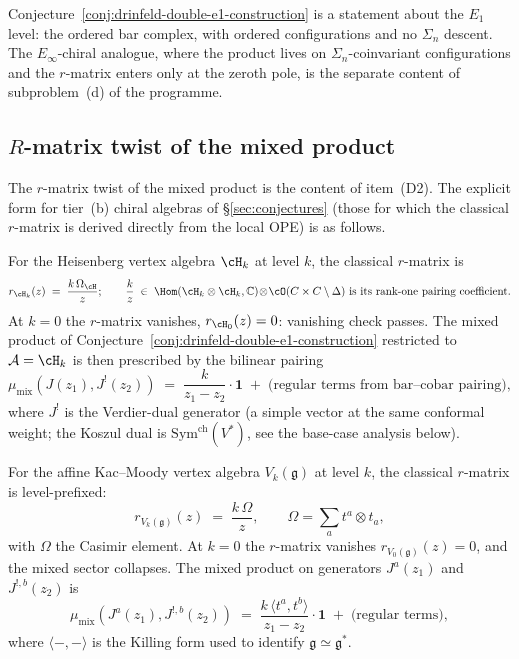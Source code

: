 Conjecture~\ref{conj:drinfeld-double-e1-construction}
is a statement about the $E_1$ level: the ordered bar
complex, with ordered configurations and no $\Sigma_n$
descent. The $E_\infty$-chiral analogue, where the product
lives on $\Sigma_n$-coinvariant configurations and the
$r$-matrix enters only at the zeroth pole, is the separate
content of subproblem~(d) of the programme.

\subsection{$R$-matrix twist of the mixed product}
\label{subsec:drinfeld-e1-twist}

The $r$-matrix twist of the mixed product is the content of
item~(D2). The explicit form for tier~(b) chiral
algebras of \S\ref{sec:conjectures} (those for which the
classical $r$-matrix is derived directly from the local OPE)
is as follows.

For the Heisenberg vertex algebra $\cH_k$ at level $k$, the
classical $r$-matrix is
\begin{equation}
\label{eq:drinfeld-r-heisenberg}
r_{\cH_k}(z)
\;=\;
\frac{k\,\Omega_{\cH}}{z};
\qquad
\frac{k}{z}\;\in\;\Hom(\cH_k\otimes\cH_k,\mathbb{C})\!\otimes\!\cO(C\times C \setminus \Delta)
\text{ is its rank-one pairing coefficient.}
\end{equation}
At $k = 0$ the $r$-matrix vanishes, $r_{\cH_0}(z) = 0$:
vanishing check passes. The mixed product of
Conjecture~\ref{conj:drinfeld-double-e1-construction}
restricted to $\cA = \cH_k$ is then prescribed by the
bilinear pairing
\begin{equation}
\label{eq:drinfeld-mix-heisenberg}
\mu_{\mathrm{mix}}(J(z_1),J^!(z_2))
\;=\;
\frac{k}{z_1-z_2}\cdot \mathbf 1
\;+\;\text{(regular terms from bar--cobar pairing)},
\end{equation}
where $J^!$ is the Verdier-dual generator (a simple vector
at the same conformal weight; the Koszul dual is
$\mathrm{Sym}^{\mathrm{ch}}(V^*)$, see the base-case analysis below).

For the affine Kac--Moody vertex algebra $V_k(\mathfrak g)$
at level $k$, the classical $r$-matrix is level-prefixed:
\begin{equation}
\label{eq:drinfeld-r-kmc}
r_{V_k(\mathfrak g)}(z) \;=\;\frac{k\,\Omega}{z},
\qquad
\Omega = \sum_a t^a\otimes t_a,
\end{equation}
with $\Omega$ the Casimir element. At $k=0$ the $r$-matrix
vanishes $r_{V_0(\mathfrak g)}(z) = 0$, and the mixed
sector collapses. The mixed
product on generators $J^a(z_1)$ and $J^{!,b}(z_2)$ is
\begin{equation}
\label{eq:drinfeld-mix-kmc}
\mu_{\mathrm{mix}}(J^a(z_1), J^{!,b}(z_2))
\;=\;
\frac{k\,\langle t^a,t^b\rangle}{z_1 - z_2}\cdot\mathbf 1
\;+\;\text{(regular terms)},
\end{equation}
where $\langle-,-\rangle$ is the Killing form used to
identify $\mathfrak g\simeq\mathfrak g^*$.

